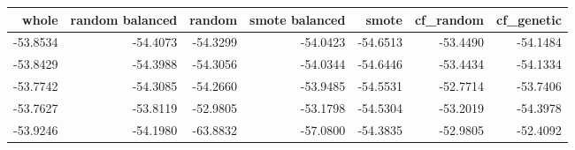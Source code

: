 \begin{tabular}{rrrrrrr}
\toprule

   whole &  random balanced &   random &  smote balanced &    smote &  cf\_random &  cf\_genetic \\
\midrule

-53.8534 &         -54.4073 & -54.3299 &        -54.0423 & -54.6513 &   -53.4490 &    -54.1484 \\
-53.8429 &         -54.3988 & -54.3056 &        -54.0344 & -54.6446 &   -53.4434 &    -54.1334 \\
-53.7742 &         -54.3085 & -54.2660 &        -53.9485 & -54.5531 &   -52.7714 &    -53.7406 \\
-53.7627 &         -53.8119 & -52.9805 &        -53.1798 & -54.5304 &   -53.2019 &    -54.3978 \\
-53.9246 &         -54.1980 & -63.8832 &        -57.0800 & -54.3835 &   -52.9805 &    -52.4092 \\

\bottomrule
\end{tabular}

